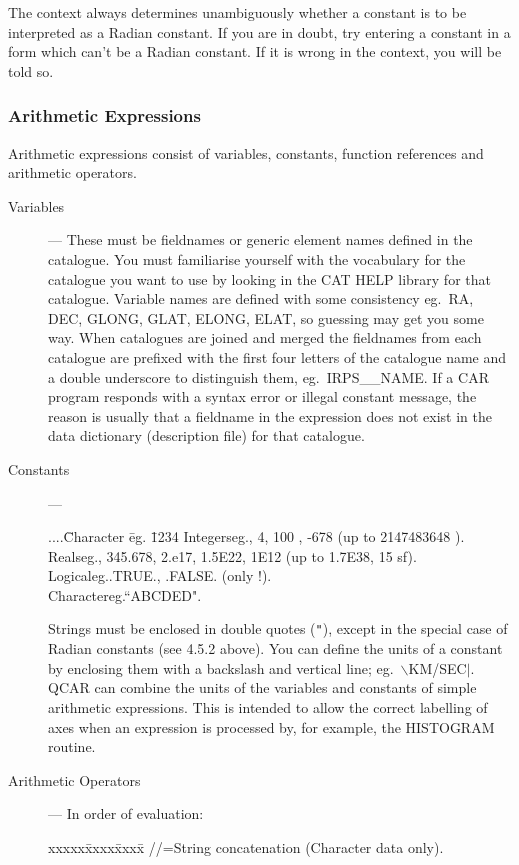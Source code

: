 The context always determines unambiguously whether a constant is to be
interpreted as a Radian constant.
If you are in doubt, try entering a constant in a form which can't be a Radian
constant.
If it is wrong in the context, you will be told so.
\subsubsection {Arithmetic Expressions}
Arithmetic expressions consist of variables, constants, function references and
arithmetic operators.
\begin{description}
\item [Variables] ---
These must be fieldnames or generic element names defined in the catalogue.
You must familiarise yourself with the vocabulary for the catalogue you want to
use by looking in the CAT HELP library for that catalogue.
Variable names are defined with some consistency eg.\  RA, DEC, GLONG, GLAT,
ELONG, ELAT, so guessing may get you some way.
When catalogues are joined and merged the fieldnames from each catalogue are
prefixed with the first four letters of the catalogue name and a double
underscore to distinguish them, eg.\  IRPS\_\_NAME.
If a CAR program responds with a syntax error or illegal constant message, the
reason is usually that a fieldname in the expression does not exist in the data
dictionary (description file) for that catalogue.
\item [Constants] ---
\begin{tabbing}
....\=Character \=eg. \=1234\kill
\>Integers\>eg., 4, 100 , -678  (up to 2147483648 ).\\
\>Reals\>eg., 345.678, 2.e17, 1.5E22, 1E12 (up to 1.7E38, 15 sf).\\
\>Logical\>eg.\>.TRUE., .FALSE. (only !).\\
\>Character\>eg.\>``ABCDED".
\end{tabbing}
Strings must be enclosed in double quotes ({\tt "}), except in the special case 
of Radian constants (see 4.5.2 above).
You can define the units of a constant by enclosing them with a backslash and
vertical line; eg.\  $\backslash$KM/SEC$|$.
QCAR can combine the units of the variables and constants of simple arithmetic
expressions.
This is intended to allow the correct labelling of axes when an expression is
processed by, for example, the HISTOGRAM routine.
\item [Arithmetic Operators] ---
In order of evaluation:
\begin{tabbing}
xxxxx\=xxxx\=xxx\=x\kill
\>//\>=\>String concatenation (Character data only).\\

\end{tabbing}
\end{description}
